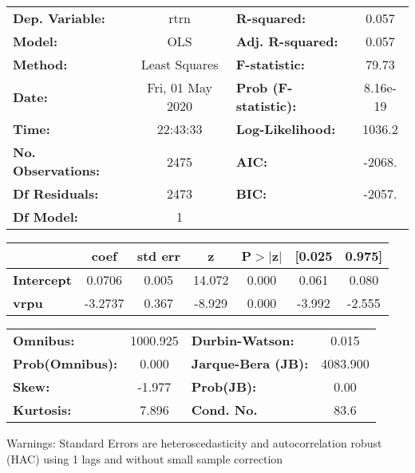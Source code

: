 \begin{center}
\begin{tabular}{lclc}
\toprule
\textbf{Dep. Variable:}    &       rtrn       & \textbf{  R-squared:         } &     0.057   \\
\textbf{Model:}            &       OLS        & \textbf{  Adj. R-squared:    } &     0.057   \\
\textbf{Method:}           &  Least Squares   & \textbf{  F-statistic:       } &     79.73   \\
\textbf{Date:}             & Fri, 01 May 2020 & \textbf{  Prob (F-statistic):} &  8.16e-19   \\
\textbf{Time:}             &     22:43:33     & \textbf{  Log-Likelihood:    } &    1036.2   \\
\textbf{No. Observations:} &        2475      & \textbf{  AIC:               } &    -2068.   \\
\textbf{Df Residuals:}     &        2473      & \textbf{  BIC:               } &    -2057.   \\
\textbf{Df Model:}         &           1      & \textbf{                     } &             \\
\bottomrule
\end{tabular}
\begin{tabular}{lcccccc}
                   & \textbf{coef} & \textbf{std err} & \textbf{z} & \textbf{P$> |$z$|$} & \textbf{[0.025} & \textbf{0.975]}  \\
\midrule
\textbf{Intercept} &       0.0706  &        0.005     &    14.072  &         0.000        &        0.061    &        0.080     \\
\textbf{vrpu}      &      -3.2737  &        0.367     &    -8.929  &         0.000        &       -3.992    &       -2.555     \\
\bottomrule
\end{tabular}
\begin{tabular}{lclc}
\textbf{Omnibus:}       & 1000.925 & \textbf{  Durbin-Watson:     } &    0.015  \\
\textbf{Prob(Omnibus):} &   0.000  & \textbf{  Jarque-Bera (JB):  } & 4083.900  \\
\textbf{Skew:}          &  -1.977  & \textbf{  Prob(JB):          } &     0.00  \\
\textbf{Kurtosis:}      &   7.896  & \textbf{  Cond. No.          } &     83.6  \\
\bottomrule
\end{tabular}
\end{center}

Warnings: \newline
 [1] Standard Errors are heteroscedasticity and autocorrelation robust (HAC) using 1 lags and without small sample correction
